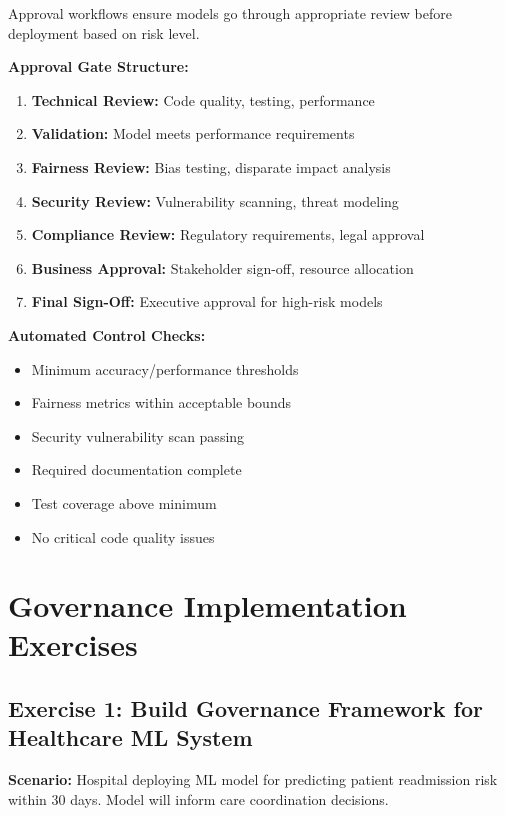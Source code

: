 Approval workflows ensure models go through appropriate review before deployment based on risk level.

\textbf{Approval Gate Structure:}

\begin{enumerate}
    \item \textbf{Technical Review:} Code quality, testing, performance
    \item \textbf{Validation:} Model meets performance requirements
    \item \textbf{Fairness Review:} Bias testing, disparate impact analysis
    \item \textbf{Security Review:} Vulnerability scanning, threat modeling
    \item \textbf{Compliance Review:} Regulatory requirements, legal approval
    \item \textbf{Business Approval:} Stakeholder sign-off, resource allocation
    \item \textbf{Final Sign-Off:} Executive approval for high-risk models
\end{enumerate}

\textbf{Automated Control Checks:}

\begin{itemize}
    \item Minimum accuracy/performance thresholds
    \item Fairness metrics within acceptable bounds
    \item Security vulnerability scan passing
    \item Required documentation complete
    \item Test coverage above minimum
    \item No critical code quality issues
\end{itemize}

\section{Governance Implementation Exercises}

\subsection{Exercise 1: Build Governance Framework for Healthcare ML System}

\textbf{Scenario:} Hospital deploying ML model for predicting patient readmission risk within 30 days. Model will inform care coordination decisions.

